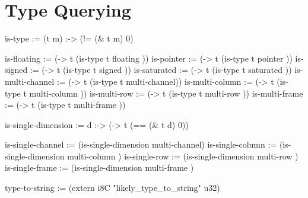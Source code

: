 \documentclass[twoside=false, numbers=noenddot]{scrbook}
\newenvironment{likely}
{ \verbatim }
{ \endverbatim }
\begin{document}
\section{Type Querying}
\begin{likely}
is-type :=
 (t m) :->
   (!= (& t m) 0)

is-floating      := (-> t (is-type t floating     ))
is-pointer       := (-> t (is-type t pointer      ))
is-signed        := (-> t (is-type t signed       ))
is-saturated     := (-> t (is-type t saturated    ))
is-multi-channel := (-> t (is-type t multi-channel))
is-multi-column  := (-> t (is-type t multi-column ))
is-multi-row     := (-> t (is-type t multi-row    ))
is-multi-frame   := (-> t (is-type t multi-frame  ))

is-single-dimension :=
  d :->
   (-> t (== (& t d) 0))

is-single-channel := (is-single-dimension multi-channel)
is-single-column  := (is-single-dimension multi-column )
is-single-row     := (is-single-dimension multi-row    )
is-single-frame   := (is-single-dimension multi-frame  )

type-to-string :=
  (extern i8C "likely_type_to_string" u32)
\end{likely}
\end{document}

